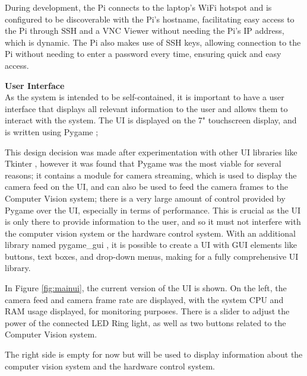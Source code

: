 During development, the Pi connects to the laptop's WiFi hotspot and is configured to be discoverable with the Pi's hostname, facilitating easy access to the Pi through
SSH and a VNC Viewer without needing the Pi's IP address, which is dynamic. The Pi also makes use of SSH keys, allowing connection 
to the Pi without needing to enter a password every time, ensuring quick and easy access.



\noindent
\textbf{User Interface} \\
As the system is intended to be self-contained, it is important to have a user interface that displays all relevant information to the user
and allows them to interact with the system. The UI is displayed on the 7" touchscreen display, and is written using Pygame \cite{pygamedoc};

This design decision was made after experimentation with other UI libraries like Tkinter \cite{tkinterdoc}, however it was found that Pygame was the most
viable for several reasons; it contains a module for camera streaming, which is used to display the camera feed on the UI, and can also be used to
feed the camera frames to the Computer Vision system; there is a very large amount of control provided by Pygame over the UI, especially in terms of 
performance. This is crucial as the UI is only there to provide information to the user, and so it must not interfere with the
computer vision system or the hardware control system. With an additional library named pygame\_gui \cite{pygamegui}, it is possible to create a UI with 
GUI elements like buttons, text boxes, and drop-down menus, making for a fully comprehensive UI library.

In Figure \ref{fig:mainui}, the current version of the UI is shown. On the left, the camera feed and camera frame rate are displayed, with the system
CPU and RAM usage displayed, for monitoring purposes. There is a slider to adjust the power of the connected LED Ring light, as well as two buttons
related to the Computer Vision system.

The right side is empty for now but will be used to display information about the computer vision system and the hardware control system.

